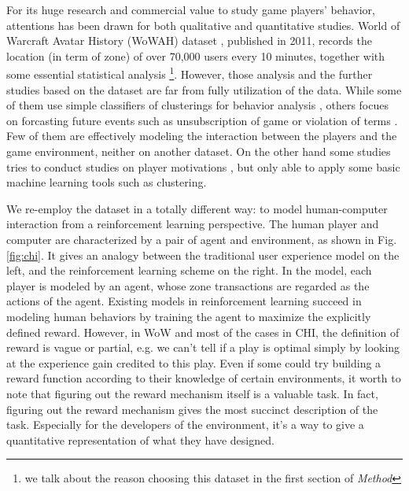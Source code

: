 \documentclass{sigchi}
\begin{document}
For its huge research and commercial value to study game players' behavior, attentions has been drawn for both qualitative and quantitative studies. World of Warcraft Avatar History (WoWAH) dataset \cite{lee2011world}, published in 2011, records the location (in term of zone) of over 70,000 users every 10 minutes, together with some essential statistical analysis \footnote{we talk about the reason choosing this dataset in the first section of \textit{Method}}. However, those analysis and the further studies based on the dataset are far from fully utilization of the data. While some of them use simple classifiers of clusterings for behavior analysis \cite{suznjevic2011mmorpg,drachen2014comparison}, others focues on forcasting future events such as unsubscription of game or violation of terms \cite{bauckhage2015clustering,thawonmas2011analysis,lou2012forecasting}. Few of them are effectively modeling the interaction between the players and the game environment, neither on another dataset. On the other hand some studies tries to conduct studies on player motivations \cite{Bell2013a}, but only able to apply some basic machine learning tools such as clustering.  

We re-employ the dataset in a totally different way: to model human-computer interaction from a reinforcement learning perspective. The human player and computer are characterized by a pair of agent and environment, as shown in Fig. \ref{fig:chi}. It gives an analogy between the traditional user experience model on the left, and the reinforcement learning scheme on the right. In the model, each player is modeled by an agent, whose zone transactions are regarded as the actions of the agent. Existing models in reinforcement learning succeed in modeling human behaviors by training the agent to maximize the explicitly defined reward. However, in WoW and most of the cases in CHI, the definition of reward is vague or partial, e.g. we can't tell if a play is optimal simply by looking at the experience gain credited to this play. Even if some could try building a reward function according to their knowledge of certain environments, it worth to note that figuring out the reward mechanism itself is a valuable task. In fact, figuring out the reward mechanism gives the most succinct description of the task. Especially for the developers of the environment, it's a way to give a quantitative representation of what they have designed.
\end{document}
